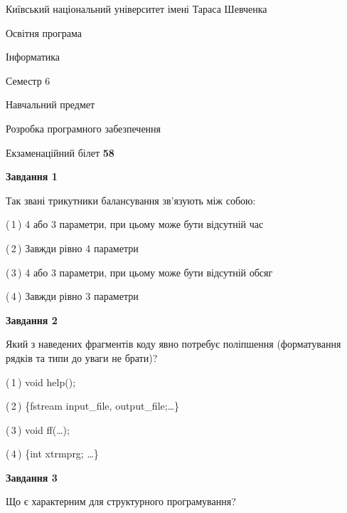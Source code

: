 \documentclass[10pt, ukrainian]{article}
\begin{document}
{{\begin {small}\par
{ \center  Київський національний університет імені Тараса Шевченка \par}
{\parbox {5 cm}{Освітня програма \hfill}{\parbox {7 cm}{Інформатика \hfill}}\parbox {6 cm}{\hfill Семестр 6}}\par
{\parbox {5 cm} {Навчальний предмет \hfill}\parbox {7 cm}{Розробка програмного забезпечення \hfill}\parbox {6cm}{\hfill}\par}\vspace{-7pt} \end{small}}{\center Екзаменаційний білет \No \textbf
{ 58 }\par}}
{
\begin {large}
{\begin {center}\textbf{Завдання 1}\end {center}}\par
Так звані трикутники балансування зв'язують між собою:\par
\vspace{2mm}



(\,1\,) 4 або 3 параметри, при цьому може бути відсутній час%



(\,2\,) Завжди рівно 4 параметри%



(\,3\,) 4 або 3 параметри, при цьому може бути відсутній обсяг %



(\,4\,) Завжди рівно 3 параметри%


{\begin {center}\textbf{Завдання 2}\end {center}}\par
Який з наведених фрагментів коду явно потребує поліпшення (форматування рядків та типи до уваги не брати)?\par
\vspace{2mm}



(\,1\,) void help();%



(\,2\,) \{fstream input\_file, output\_file;…\} %



(\,3\,) void ff(…);%



(\,4\,) \{int xtrmprg; …\}%


{\begin {center}\textbf{Завдання 3}\end {center}}\par
Що є характерним для структурного програмування?\par
\vspace{2mm}




\end{large}}
\end{document}
